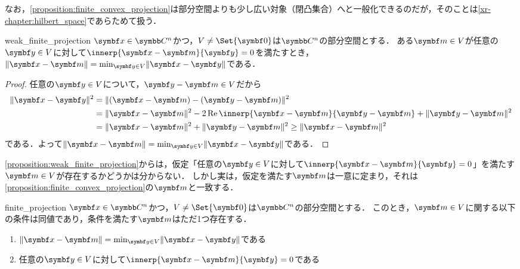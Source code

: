 \documentclass[../../main]{subfiles}
\begin{document}
なお，\cref{proposition:finite_convex_projection}は部分空間よりも少し広い対象（閉凸集合）へと一般化できるのだが，そのことは\cref{xr-chapter:hilbert_space}であらためて扱う．

\begin{proposition}{}{weak_finite_projection}
  \(\vect{x}\in\numset{C}^n\)かつ，\(V\neq\Set{\zvec}\)は\(\numset{C}^n\)の部分空間とする．
  ある\(\vect{m}\in V\)が任意の\(\vect{y}\in V\)に対して\(\innerp{\vect{x}-\vect{m}}{\vect{y}}=0\)を満たすとき，
  \(\vnorm{\vect{x}-\vect{m}}=\min_{\vect{y}\in V}\vnorm{\vect{x}-\vect{y}}\)である．
\end{proposition}

\begin{proof}
  任意の\(\vect{y}\in V\)について，\(\vect{y}-\vect{m}\in V\)だから
  \begin{align*}
    \vnorm{\vect{x}-\vect{y}}^2 &= \vnorm{(\vect{x}-\vect{m})-(\vect{y}-\vect{m})}^2 \\
    &= \vnorm{\vect{x}-\vect{m}}^2-2\rpart\innerp{\vect{x}-\vect{m}}{\vect{y}-\vect{m}}+\vnorm{\vect{y}-\vect{m}}^2 \\
    &= \vnorm{\vect{x}-\vect{m}}^2+\vnorm{\vect{y}-\vect{m}}^2 \geq \vnorm{\vect{x}-\vect{m}}^2
  \end{align*}
  である．よって\(\vnorm{\vect{x}-\vect{m}}=\min_{\vect{y}\in V}\vnorm{\vect{x}-\vect{y}}\)である．
\end{proof}

\cref{proposition:weak_finite_projection}からは，仮定「任意の\(\vect{y}\in V\)に対して\(\innerp{\vect{x}-\vect{m}}{\vect{y}}=0\)」を満たす\(\vect{m}\in V\)が存在するかどうかは分からない．
しかし実は，仮定を満たす\(\vect{m}\)は一意に定まり，それは\cref{proposition:finite_convex_projection}の\(\vect{m}\)と一致する．

\begin{proposition}{}{finite_projection}
  \(\vect{x}\in\numset{C}^n\)かつ，\(V\neq\Set{\zvec}\)は\(\numset{C}^n\)の部分空間とする．
  このとき，\(\vect{m}\in V\)に関する以下の条件は同値であり，条件を満たす\(\vect{m}\)はただ1つ存在する．
  \begin{enumerate}
    \item \(\vnorm{\vect{x}-\vect{m}}=\min_{\vect{y}\in V}\vnorm{\vect{x}-\vect{y}}\)である
    \item 任意の\(\vect{y}\in V\)に対して\(\innerp{\vect{x}-\vect{m}}{\vect{y}}=0\)である
  \end{enumerate}
\end{proposition}
\end{document}
